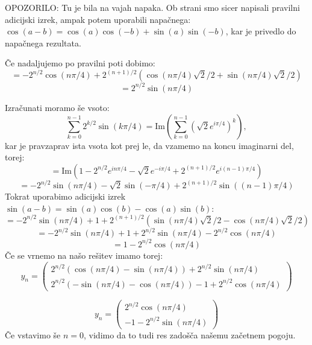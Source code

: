 \documentclass{article}
\begin{document}
\noindent
OPOZORILO: Tu je bila na vajah napaka. Ob strani smo sicer napisali pravilni adicijski izrek, ampak potem uporabili napačnega: $\cos(a-b) = \cos(a)\cos(-b) + \sin(a) \sin(-b)$, kar je privedlo do napačnega rezultata.

\noindent
Če nadaljujemo po pravilni poti dobimo:
\begin{equation*}
= -2^{n/2} \cos(n \pi / 4) + 2^{(n+1)/2} \left( \cos(n \pi/4) \sqrt{2}/2 + \sin(n \pi/4) \sqrt{2}/2 \right) 
\end{equation*}
\begin{equation*}
=  2^{n/2} \sin(n \pi/4)  
\end{equation*}

Izračunati moramo še vsoto:
\begin{equation*}
\sum_{k=0}^{n-1} 2^{k/2}  \sin(k \pi / 4) = \mathrm{Im} \left( \sum_{k=0}^{n-1} (\sqrt{2} e^{i \pi /4 })^k \right), 
\end{equation*}
kar je pravzaprav ista vsota kot prej le, da vzamemo na koncu imaginarni del, torej:
\begin{equation*}
= \mathrm{Im} \left( 1-2^{n/2} e^{i n \pi /4} - \sqrt{2} e^{-i \pi /4} + 2^{(n+1)/2} e^{i(n-1) \pi/ 4} \right)
\end{equation*}
\begin{equation*}
= -2^{n/2}\sin(n \pi/4) - \sqrt{2} \sin(-\pi/4) + 2^{(n+1)/2} \sin((n-1)\pi/4)
\end{equation*}
Tokrat uporabimo adicijski izrek $\sin(a-b) = \sin(a)\cos(b) - \cos(a) \sin(b)$:
\begin{equation*}
= -2^{n/2}\sin(n \pi/4)  +1 + 2^{(n+1)/2} \left(\sin(n \pi/4) \sqrt{2}/2 - \cos(n \pi/4) \sqrt{2}/2 \right)
\end{equation*}
\begin{equation*}
= -2^{n/2}\sin(n \pi/4)  +1 + 2^{n/2} \sin(n \pi/4)  - 2^{n/2} \cos(n \pi / 4)
\end{equation*}
\begin{equation*}
= 1 - 2^{n/2} \cos(n \pi / 4)
\end{equation*}
Če se vrnemo na našo rešitev imamo torej:
\begin{equation*}
y_n =
\begin{pmatrix}
2^{n/2} ( \cos(n \pi/4) - \sin(n \pi/4)) + 2^{n/2} \sin(n \pi/4) \\
2^{n/2} (-\sin(n \pi/4) - \cos(n \pi/4))  -1  + 2^{n/2} \cos(n \pi/4)
\end{pmatrix}
\end{equation*}

\begin{equation*}
y_n =
\begin{pmatrix}
2^{n/2} \cos(n \pi/4)  \\
-1 - 2^{n/2} \sin(n \pi /4)
\end{pmatrix}
\end{equation*}
Če vstavimo še $n=0$, vidimo da to tudi res zadošča našemu začetnem pogoju.
\end{document}
